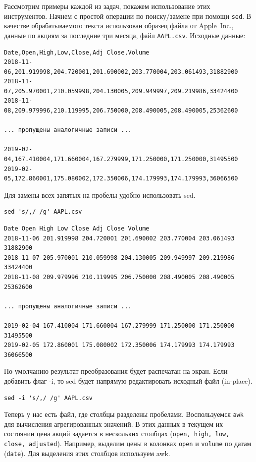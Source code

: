 \documentclass[a4paper,12pt,final,openany]{extbook}
\begin{document}
Рассмотрим примеры каждой из задач, покажем использование этих
инструментов. Начнем с простой операции по поиску/замене при помощи \texttt{sed}.
В качестве обрабатываемого текста использован образец файла от Apple~Inc., данные по акциям за последние три месяца, файл \texttt{AAPL.csv}.
Исходные данные:

\begin{verbatim}
Date,Open,High,Low,Close,Adj Close,Volume
2018-11-06,201.919998,204.720001,201.690002,203.770004,203.061493,31882900
2018-11-07,205.970001,210.059998,204.130005,209.949997,209.219986,33424400
2018-11-08,209.979996,210.119995,206.750000,208.490005,208.490005,25362600

... пропущены аналогичные записи ...

2019-02-04,167.410004,171.660004,167.279999,171.250000,171.250000,31495500
2019-02-05,172.860001,175.080002,172.350006,174.179993,174.179993,36066500
\end{verbatim}

Для замены всех запятых на пробелы удобно использовать sed.

\begin{verbatim}
sed 's/,/ /g' AAPL.csv
\end{verbatim}

\begin{verbatim}
Date Open High Low Close Adj Close Volume
2018-11-06 201.919998 204.720001 201.690002 203.770004 203.061493 31882900
2018-11-07 205.970001 210.059998 204.130005 209.949997 209.219986 33424400
2018-11-08 209.979996 210.119995 206.750000 208.490005 208.490005 25362600

... пропущены аналогичные записи ...

2019-02-04 167.410004 171.660004 167.279999 171.250000 171.250000 31495500
2019-02-05 172.860001 175.080002 172.350006 174.179993 174.179993 36066500
\end{verbatim}

По умолчанию результат преобразования будет распечатан на экран. Если добавить флаг -i,
то sed будет напрямую редактировать исходный файл (in-place).

\begin{verbatim}
sed -i 's/,/ /g' AAPL.csv
\end{verbatim}

Теперь у нас есть файл, где столбцы разделены пробелами. Воспользуемся
\texttt{awk} для вычисления агрегированных значений.
В этих данных в текущем их состоянии цена акций задается в нескольких столбцах (\texttt{open, high, low, close, adjusted}).
Например, выделим цены в колонках \texttt{open} и \texttt{volume} по датам (\texttt{date}). Для
выделения этих столбцов используем awk.
\end{document}
